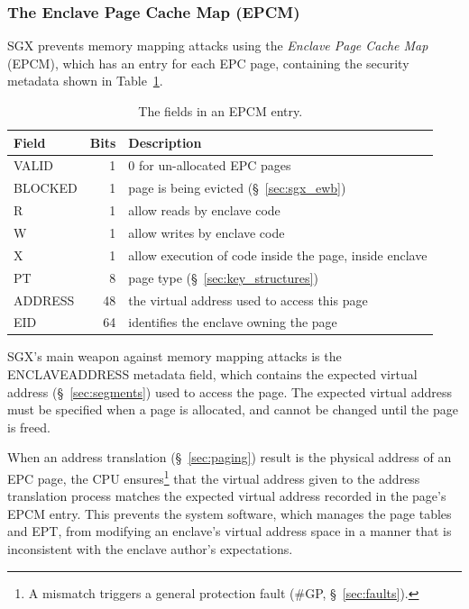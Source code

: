 \subsubsection{The Enclave Page Cache Map (EPCM)}
\label{sec:epcm}


SGX prevents memory mapping attacks using the \textit{Enclave Page Cache Map}
(EPCM), which has an entry for each EPC page, containing the security metadata
shown in Table~\ref{fig:epcm_entry}.

\begin{table}[hbt]
  \centering
  \begin{tabularx}{\columnwidth}{| l | r | X |}
  \hline
  \textbf{Field} & \textbf{Bits} & \textbf{Description}\\
  \hline
  VALID & 1 & 0 for un-allocated EPC pages \\
  \hline
  BLOCKED & 1 & page is being evicted (\S~\ref{sec:sgx_ewb})\\
  \hline
  R & 1 & allow reads by enclave code\\
  \hline
  W & 1 & allow writes by enclave code\\
  \hline
  X & 1 & allow execution of code inside the page, inside enclave\\
  \hline
  PT & 8 & page type (\S~\ref{sec:key_structures})\\
  \hline
  ADDRESS & 48 & the virtual address used to access this page\\
  \hline
  EID & 64 & identifies the enclave owning the page\\
  \hline
  \end{tabularx}
  \caption{
    The fields in an EPCM entry.
  }
  \label{fig:epcm_entry}
\end{table}


SGX's main weapon against memory mapping attacks is the ENCLAVEADDRESS metadata
field, which contains the expected virtual address (\S~\ref{sec:segments}) used
to access the page. The expected virtual address must be specified when a page
is allocated, and cannot be changed until the page is freed.

When an address translation (\S~\ref{sec:paging}) result is the physical
address of an EPC page, the CPU ensures\footnote{A mismatch triggers a general
protection fault (\#GP, \S~\ref{sec:faults}).} that the virtual address given
to the address translation process matches the expected virtual address
recorded in the page's EPCM entry.  This prevents the system software, which
manages the page tables and EPT, from modifying an enclave's virtual address
space in a manner that is inconsistent with the enclave author's expectations.

